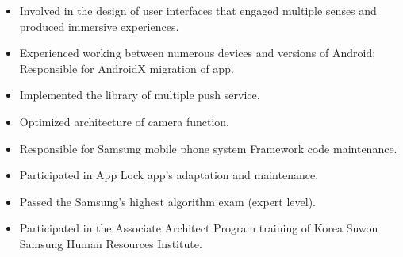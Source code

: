 \documentclass{resume}
\begin{document}
    \begin{itemize}
        \item Involved in the design of user interfaces that engaged multiple senses and produced immersive experiences.
        \item Experienced working between numerous devices and versions of Android; Responsible for AndroidX migration of app.
        \item Implemented the library of multiple push service.
        \item Optimized architecture of camera function.
    \end{itemize}

    \begin{itemize}
        \item Responsible for Samsung mobile phone system Framework code maintenance.
        \item Participated in App Lock app's adaptation and maintenance.
        \item Passed the Samsung's highest algorithm exam (expert level).
        \item Participated in the Associate Architect Program training of Korea Suwon Samsung Human Resources Institute.
    \end{itemize}
\end{document}

